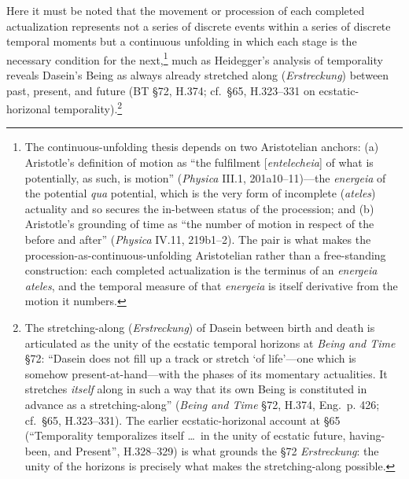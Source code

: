 Here it must be noted that the movement or procession of each completed actualization represents not a series of discrete events within a series of discrete temporal moments but a continuous unfolding in which each stage is the necessary condition for the next,\footnote{The continuous-unfolding thesis depends on two Aristotelian anchors: (a) Aristotle's definition of motion as ``the fulfilment [\textit{entelecheia}] of what is potentially, as such, is motion'' (\textit{Physica} III.1, 201a10--11)---the \textit{energeia} of the potential \textit{qua} potential, which is the very form of incomplete (\textit{ateles}) actuality and so secures the in-between status of the procession; and (b) Aristotle's grounding of time as ``the number of motion in respect of the before and after'' (\textit{Physica} IV.11, 219b1--2). The pair is what makes the procession-as-continuous-unfolding Aristotelian rather than a free-standing construction: each completed actualization is the terminus of an \textit{energeia ateles}, and the temporal measure of that \textit{energeia} is itself derivative from the motion it numbers.} much as Heidegger's analysis of temporality reveals Dasein's Being as always already stretched along (\textit{Erstreckung}) between past, present, and future (BT §72, H.374; cf.~§65, H.323--331 on ecstatic-horizonal temporality).\footnote{The stretching-along (\textit{Erstreckung}) of Dasein between birth and death is articulated as the unity of the ecstatic temporal horizons at \textit{Being and Time} §72: ``Dasein does not fill up a track or stretch `of life'---one which is somehow present-at-hand---with the phases of its momentary actualities. It stretches \textit{itself} along in such a way that its own Being is constituted in advance as a stretching-along'' (\textit{Being and Time} §72, H.374, Eng.~p. 426; cf.~§65, H.323--331). The earlier ecstatic-horizonal account at §65 (``Temporality temporalizes itself \ldots\ in the unity of ecstatic future, having-been, and Present'', H.328--329) is what grounds the §72 \textit{Erstreckung}: the unity of the horizons is precisely what makes the stretching-along possible.}

